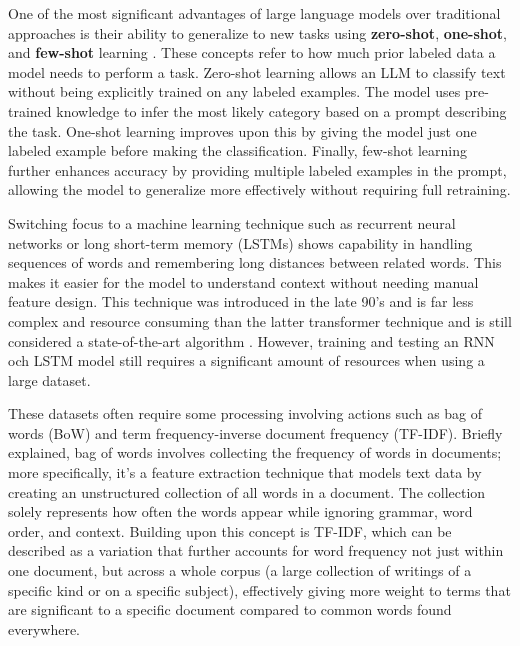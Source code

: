 One of the most significant advantages of large language models over traditional approaches is their ability to generalize to new tasks using \textbf{zero-shot}, \textbf{one-shot}, and \textbf{few-shot} learning \cite{brown2020language}. These concepts refer to how much prior labeled data a model needs to perform a task. Zero-shot learning allows an LLM to classify text without being explicitly trained on any labeled examples. The model uses pre-trained knowledge to infer the most likely category based on a prompt describing the task. One-shot learning improves upon this by giving the model just one labeled example before making the classification. Finally, few-shot learning further enhances accuracy by providing multiple labeled examples in the prompt, allowing the model to generalize more effectively without requiring full retraining.

Switching focus to a machine learning technique such as recurrent neural networks or long short-term memory (LSTMs) shows capability in handling sequences of words and remembering long distances between related words. This makes it easier for the model to understand context without needing manual feature design. This technique was introduced in the late 90's and is far less complex and resource consuming than the latter transformer technique and is still considered a state-of-the-art algorithm \cite{wang2024classifiers, hochreiter1997long}. However, training and testing an RNN och LSTM model still requires a significant amount of resources when using a large dataset.

These datasets often require some processing involving actions such as bag of words (BoW) and term frequency-inverse document frequency (TF-IDF). Briefly explained, \cite{murel2024bagofwords} bag of words involves collecting the frequency of words in documents; more specifically, it's a feature extraction technique that models text data by creating an unstructured collection of all words in a document. The collection solely represents how often the words appear while ignoring grammar, word order, and context. Building upon this concept is TF-IDF, which can be described as a variation that further accounts for word frequency not just within one document, but across a whole corpus (a large collection of writings of a specific kind or on a specific subject), effectively giving more weight to terms that are significant to a specific document compared to common words found everywhere.

